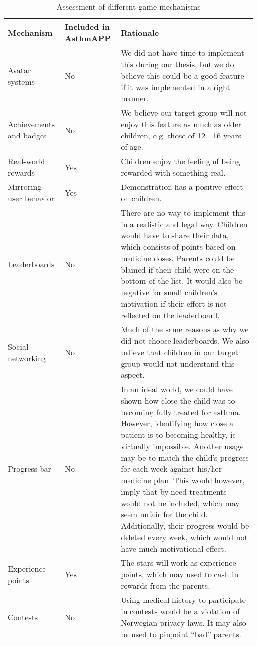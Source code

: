 \begin{onehalfspacing}
\begin{table}[H]
\begin{tabular}{| p{2.5cm} | p{2.1cm} | p{8.8cm} | }
	\hline
	\textbf{Mechanism} & \textbf{Included in AsthmAPP} & \textbf{Rationale} \\
	\hline
	Avatar systems & No & We did not have time to implement this during our thesis, but we do believe this could be a good feature if it was implemented in a right manner.    
	 \\
	\hline
	Achievements and badges & No & We believe our target group will not enjoy this feature as much as older children, e.g. those of 12 - 16 years of age.  \\
	\hline 
	Real-world rewards & Yes & Children enjoy the feeling of being rewarded with something real.
	 \\
	\hline
	Mirroring user behavior & Yes & Demonstration has a positive effect on children.
	\\
	\hline
	Leaderboards & No & There are no way to implement this in a realistic and legal way. Children would have to share their data, which consists of points based on medicine doses. Parents could be blamed if their child were on the bottom of the list. It would also be negative for small children's motivation if their effort is not reflected on the leaderboard. 
	\\
	\hline
	Social networking & No & Much of the same reasons as why we did not choose leaderboards. We also believe that children in our target group would not understand this aspect.  
	\\
	\hline
	Progress bar & No & In an ideal world, we could have shown how close the child was to becoming fully treated for asthma. However, identifying how close a patient is to becoming healthy, is virtually impossible. Another usage may be to match the child's progress for each week against his/her medicine plan. This would however, imply that by-need treatments would not be included, which may seem unfair for the child. Additionally, their progress would be deleted every week, which would not have much motivational effect.  
	\\
	\hline
	Experience points & Yes & The stars will work as experience points, which may used to cash in rewards from the parents. 
	\\
	\hline
	Contests & No & Using medical history to participate in contests would be a violation of Norwegian privacy laws. It may also be used to pinpoint ``bad'' parents.      
	\\
	\hline
\end{tabular}
\caption{Assessment of different game mechanisms}
\label{tab:game-mech-in-astmapp}
\end{table}
\end{onehalfspacing}

